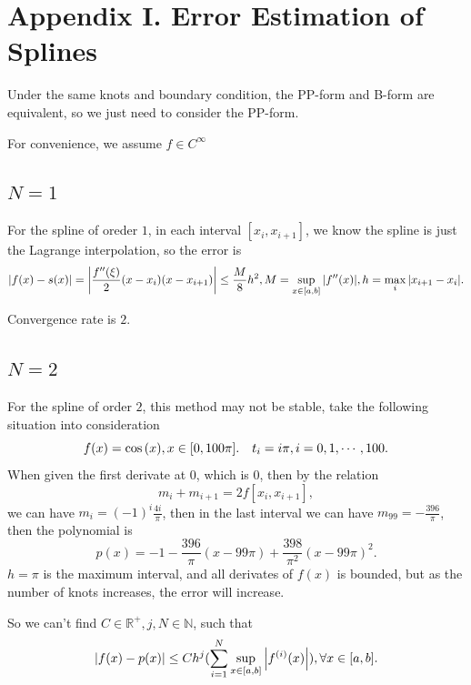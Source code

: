 \documentclass[a4paper]{article}
\begin{document}
\section{Appendix I. Error Estimation of Splines}

Under the same knots and boundary condition, the PP-form and B-form are equivalent,
so we just need to consider the PP-form.

For convenience, we assume $f \in C^{\infty}$

\subsection{$N=1$}
For the spline of oreder $1$, in each interval $[x_i, x_{i+1}]$, we know the spline is just the Lagrange interpolation,
so the error is 
\begin{equation}
    \abs{f(x) - s(x)} = \abs{\frac{f^{\prime \prime} (\xi)}{2} (x-x_i)(x-x_{i+1}) } \leq \frac{M}{8} h^2, M = \sup_{x \in [a,b]} \abs{f^{\prime \prime}(x)}, h = \max_{i} \abs{x_{i+1} - x_i}.
\end{equation}

Convergence rate is $2$.

\subsection{$N=2$}
For the spline of order $2$, this method may not be stable, take the following situation into consideration
\begin{equation}
    f(x) = \cos\qty(x), x \in [0, 100 \pi]. \quad
    t_i = i \pi, i = 0, 1, \cdots, 100.
\end{equation}
When given the first derivate at $0$, which is $0$, then by the relation
\begin{equation}
    m_i + m_{i+1} = 2 f[x_i, x_{i+1}],
\end{equation}
we can have $m_i = (-1)^i \frac{4 i}{\pi}$, then in the last interval we can have 
$m_{99} = -\frac{396}{\pi}$, then the polynomial is 
\begin{equation}
    p(x) = -1 - \frac{396}{\pi}(x-99 \pi) + \frac{398}{\pi^2}(x-99 \pi)^2.
\end{equation}
$h = \pi$ is the maximum interval, and all derivates of $f(x)$ is bounded, but as the number of knots increases, the error will increase.

So we can't find $C\in \mathbb{R}^{+}, j, N\in \mathbb{N}$, such that 
\begin{equation}
    \abs{f(x) - p(x)} \leq C h^j (\sum_{i=1}^{N} \sup_{x \in [a,b]} \abs{f^{(i)}(x)}), \forall x \in [a,b].
\end{equation}
\end{document}

